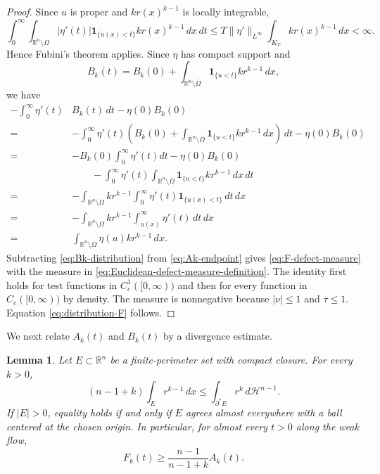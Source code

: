 \documentclass[10pt,a4paper]{amsart}
\numberwithin{equation}{section}
\newtheorem{lemma}[theorem]{Lemma}
\newcommand{\R}{\mathbb R}
\newcommand{\Om}{\Omega}
\newcommand{\calH}{\mathcal H}
\begin{document}
\begin{proof}
Since $u$ is proper and $kr(x)^{k-1}$ is locally integrable,
\begin{equation*}
    \int_0^\infty\int_{\mathbb R^n\setminus\Omega}
    |\eta'(t)|\mathbf 1_{\{u(x)<t\}}kr(x)^{k-1}\,dx\,dt
    \leq
    T\|\eta'\|_{L^\infty}\int_{K_T}kr(x)^{k-1}\,dx<\infty.
\end{equation*}
Hence Fubini's theorem applies. Since $\eta$ has compact support and
\begin{equation*}
    B_k(t)=B_k(0)
      +\int_{\R^n\setminus\overline\Om}
        \mathbf 1_{\{u<t\}}kr^{k-1}\,dx,
\end{equation*}
we have 
\begin{align}\label{eq:Bk-distribution}
 -\int_0^\infty\eta'(t)&B_k(t)\,dt-\eta(0)B_k(0)\nonumber\\
 =&-\int_0^\infty\eta'(t)\left(B_k(0)
      +\int_{\R^n\setminus\overline\Om}
        \mathbf 1_{\{u<t\}}kr^{k-1}\,dx\right)\,dt-\eta(0)B_k(0)\nonumber\\
=&-B_k(0)\int_0^\infty\eta'(t)dt-\eta(0)B_k(0)\nonumber\\
&\qquad -\int_0^\infty\eta'(t)\int_{\R^n\setminus\overline\Om}
        \mathbf 1_{\{u<t\}}kr^{k-1}\,dx \,dt\nonumber\\
 =&-\int_{\mathbb R^n\setminus\Omega}kr^{k-1}
   \int_0^\infty\eta'(t)\mathbf 1_{\{u(x)<t\}}\,dt\,dx\nonumber\\
 =&-\int_{\mathbb R^n\setminus\Omega}kr^{k-1}
   \int_{u(x)}^\infty\eta'(t)\,dt\,dx\nonumber\\
 =&\int_{\mathbb R^n\setminus\Omega}
   \eta(u)kr^{k-1}\,dx.
\end{align}
Subtracting \eqref{eq:Bk-distribution} from \eqref{eq:Ak-endpoint} gives \eqref{eq:F-defect-measure} with the measure in \eqref{eq:Euclidean-defect-measure-definition}.   The identity first holds for test functions in $C_c^1([0,\infty))$ and then for every function in $C_c([0,\infty))$ by density.  The measure is nonnegative because $|\nu|\leq1$ and $\tau\leq1$.  Equation \eqref{eq:distribution-F} follows.
\end{proof}

We next relate $A_k(t)$ and $B_k(t)$ by a divergence estimate.

\begin{lemma}\label{lem:divergence}
Let $E\subset\R^n$ be a finite-perimeter set with compact closure.  For every $k>0$,
\begin{equation}\label{eq:divergence-estimate}
    (n-1+k)\int_E r^{k-1}\,dx
    \leq
    \int_{\partial^*E}r^k\,d\calH^{n-1}.
\end{equation}
If $|E|>0$, equality holds if and only if $E$ agrees almost everywhere with a ball centered at the chosen origin. In particular, for almost every $t>0$ along the weak flow,
\begin{equation}\label{eq:B-vs-A}
    F_k(t)\geq\frac{n-1}{n-1+k}A_k(t).
\end{equation}
\end{lemma}
\end{document}

